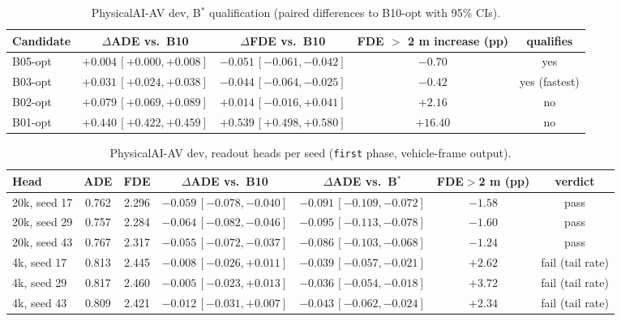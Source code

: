 \documentclass[10pt]{article}
\newcommand{\Bstar}{B$^{*}$}
\newcommand{\first}{\texttt{first}}
\begin{document}
\begin{table}[H]
\caption{PhysicalAI-AV dev, \Bstar{} qualification (paired differences to B10-opt with 95\% CIs).}
\begin{center}
\small
\begin{tabular}{lcccc}
\toprule
Candidate & $\Delta$ADE vs.\ B10 & $\Delta$FDE vs.\ B10 & FDE $>$ 2 m increase (pp) & qualifies \\
\midrule
B05-opt & $+0.004\,[+0.000,+0.008]$ & $-0.051\,[-0.061,-0.042]$ & $-0.70$ & yes \\
B03-opt & $+0.031\,[+0.024,+0.038]$ & $-0.044\,[-0.064,-0.025]$ & $-0.42$ & yes (fastest) \\
B02-opt & $+0.079\,[+0.069,+0.089]$ & $+0.014\,[-0.016,+0.041]$ & $+2.16$ & no \\
B01-opt & $+0.440\,[+0.422,+0.459]$ & $+0.539\,[+0.498,+0.580]$ & $+16.40$ & no \\
\bottomrule
\end{tabular}
\end{center}
\end{table}

\begin{table}[H]
\caption{PhysicalAI-AV dev, readout heads per seed (\first{} phase, vehicle-frame output).}
\begin{center}
\footnotesize
\setlength{\tabcolsep}{4pt}
\begin{tabular}{lcccccc}
\toprule
Head & ADE & FDE & $\Delta$ADE vs.\ B10 & $\Delta$ADE vs.\ \Bstar{} & FDE$>$2 m (pp) & verdict \\
\midrule
20k, seed 17 & 0.762 & 2.296 & $-0.059\,[-0.078,-0.040]$ & $-0.091\,[-0.109,-0.072]$ & $-1.58$ & pass \\
20k, seed 29 & 0.757 & 2.284 & $-0.064\,[-0.082,-0.046]$ & $-0.095\,[-0.113,-0.078]$ & $-1.60$ & pass \\
20k, seed 43 & 0.767 & 2.317 & $-0.055\,[-0.072,-0.037]$ & $-0.086\,[-0.103,-0.068]$ & $-1.24$ & pass \\
4k, seed 17 & 0.813 & 2.445 & $-0.008\,[-0.026,+0.011]$ & $-0.039\,[-0.057,-0.021]$ & $+2.62$ & fail (tail rate) \\
4k, seed 29 & 0.817 & 2.460 & $-0.005\,[-0.023,+0.013]$ & $-0.036\,[-0.054,-0.018]$ & $+3.72$ & fail (tail rate) \\
4k, seed 43 & 0.809 & 2.421 & $-0.012\,[-0.031,+0.007]$ & $-0.043\,[-0.062,-0.024]$ & $+2.34$ & fail (tail rate) \\
\bottomrule
\end{tabular}
\end{center}
\end{table}
\end{document}
